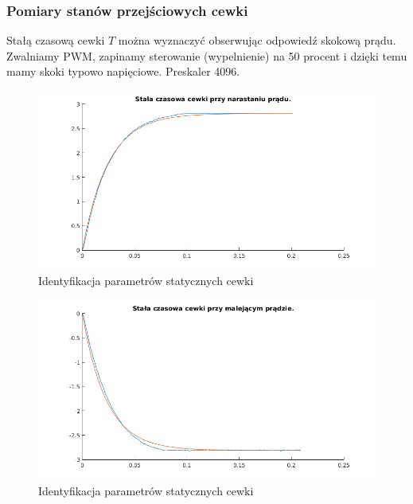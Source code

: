 \subsubsection{Pomiary stanów przejściowych cewki}

Stałą czasową cewki $T$ można wyznaczyć obserwując odpowiedź skokową prądu.
Zwalniamy PWM, zapinamy sterowanie (wypelnienie) na 50 procent i dzięki temu mamy skoki typowo napięciowe. Preskaler 4096.

\begin{figure}[H]
\centering
\includegraphics[scale=0.85]{img/identyfikacja_stala_narastanie_0245.png}
\caption{Identyfikacja parametrów statycznych cewki}
\label{rys:cewka_k_uc}
\end{figure}

\begin{figure}[H]
\centering
\includegraphics[scale=0.85]{img/identyfikacja_stala_opadanie_0230.png}
\caption{Identyfikacja parametrów statycznych cewki}
\label{rys:cewka_k_uc}
\end{figure}



